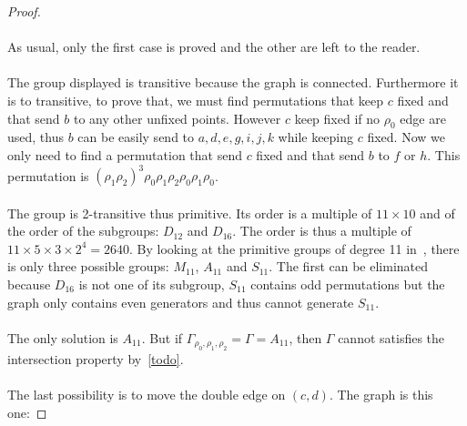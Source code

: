 \begin{proof}
\begin{figure}[H]
\begin{center}
\begin{tikzpicture}[scale=.8]
      \end{tikzpicture}
      \caption{}
    \end{center}
  \end{figure}

  \paragraph{}
  As usual, only the first case is proved and the other are left to the reader.

  \paragraph{}
  The group displayed is transitive because the graph is connected. Furthermore it is to transitive, to prove that, we must find permutations that keep $c$ fixed and that send $b$ to any other unfixed points. However $c$ keep fixed if no $\rho_0$ edge are used, thus $b$ can be easily send to $a,d,e,g,i,j,k$ while keeping $c$ fixed. Now we only need to find a permutation that send $c$ fixed and that send $b$ to $f$ or $h$. This permutation is $(\rho_1\rho_2)^3\rho_0\rho_1\rho_2\rho_0\rho_1\rho_0$.

  \paragraph{}
  The group is 2-transitive thus primitive. Its order is a multiple of $11 \times 10$ and of the order of the subgroups: $D_{12}$ and $D_{16}$. The order is thus a multiple of $11 \times 5 \times 3 \times 2^4 = 2640$. By looking at the primitive groups of degree 11 in~\cite{buekenhout1996list}, there is only three possible groups: $M_{11}$, $A_{11}$ and $S_{11}$. The first can be eliminated because $D_{16}$ is not one of its subgroup, $S_{11}$ contains odd permutations but the graph only contains even generators and thus cannot generate $S_{11}$.

  \paragraph{}
  The only solution is $A_{11}$. But if $\Gamma_{\rho_0, \rho_1, \rho_2} = \Gamma = A_{11}$, then $\Gamma$ cannot satisfies the intersection property by~\ref{todo}.

  \paragraph{}
  The last possibility is to move the double edge on $(c,d)$. The graph is this one:


\end{proof}
